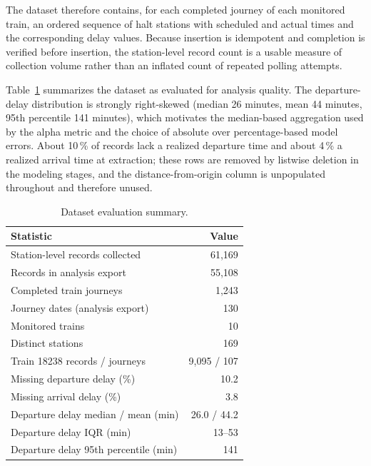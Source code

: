 \documentclass[a4paper,fleqn]{cas-dc}
\begin{document}
The dataset therefore contains, for each completed journey of each monitored
train, an ordered sequence of halt stations with scheduled and actual times
and the corresponding delay values. Because insertion is idempotent and
completion is verified before insertion, the station-level record count is a
usable measure of collection volume rather than an inflated count of repeated
polling attempts.

Table~\ref{tab:dataset_stats} summarizes the dataset as evaluated for analysis
quality. The departure-delay distribution is strongly right-skewed (median
26 minutes, mean 44 minutes, 95th percentile 141 minutes), which motivates the
median-based aggregation used by the alpha metric and the choice of absolute
over percentage-based model errors. About 10\,\% of records lack a realized
departure time and about 4\,\% a realized arrival time at extraction; these
rows are removed by listwise deletion in the modeling stages, and the
distance-from-origin column is unpopulated throughout and therefore unused.

\begin{table}[width=\columnwidth,cols=2,pos=h]
\caption{Dataset evaluation summary.}
\label{tab:dataset_stats}
\begin{tabular*}{\tblwidth}{@{\extracolsep{\fill}}l r@{}}
\toprule
Statistic & Value \\
\midrule
Station-level records collected        & 61{,}169 \\
Records in analysis export            & 55{,}108 \\
Completed train journeys              & 1{,}243 \\
Journey dates (analysis export)       & 130 \\
Monitored trains                      & 10 \\
Distinct stations                     & 169 \\
Train 18238 records / journeys        & 9{,}095 / 107 \\
Missing departure delay (\%)          & 10.2 \\
Missing arrival delay (\%)            & 3.8 \\
Departure delay median / mean (min)   & 26.0 / 44.2 \\
Departure delay IQR (min)              & 13--53 \\
Departure delay 95th percentile (min) & 141 \\
\bottomrule
\end{tabular*}
\end{table}
\end{document}

